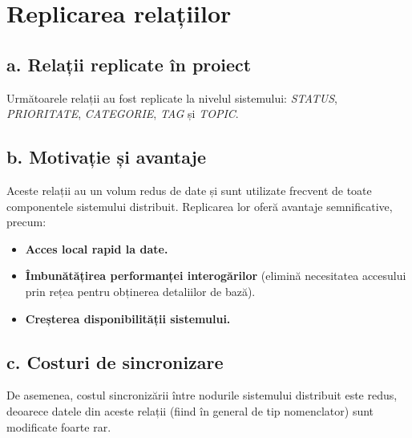 \chapter{Replicarea relațiilor}
\label{sec:replicare}

\section*{a. Relații replicate în proiect}

Următoarele relații au fost replicate la nivelul sistemului: \textit{STATUS}, \textit{PRIORITATE}, \textit{CATEGORIE}, \textit{TAG} și \textit{TOPIC}.

\section*{b. Motivație și avantaje}

Aceste relații au un volum redus de date și sunt utilizate frecvent de toate componentele sistemului distribuit. Replicarea lor oferă avantaje semnificative, precum:

\begin{itemize}
    \item \textbf{Acces local rapid la date.}
    \item \textbf{Îmbunătățirea performanței interogărilor} (elimină necesitatea accesului prin rețea pentru obținerea detaliilor de bază).
    \item \textbf{Creșterea disponibilității sistemului.}
\end{itemize}

\section*{c. Costuri de sincronizare}

De asemenea, costul sincronizării între nodurile sistemului distribuit este redus, deoarece datele din aceste relații (fiind în general de tip nomenclator) sunt modificate foarte rar.